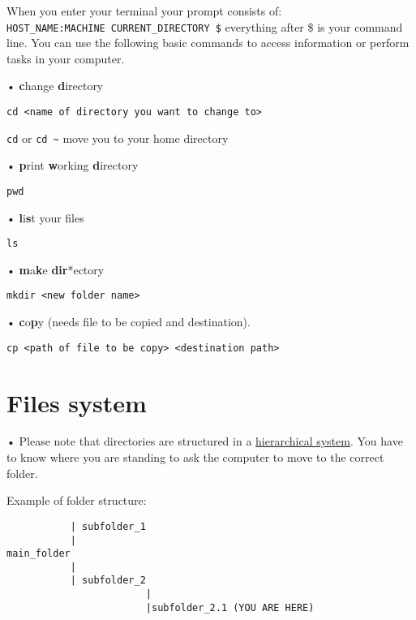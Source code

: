 \documentclass[
]{book}
\begin{document}
When you enter your terminal your prompt consists of: \texttt{HOST\_NAME:MACHINE\ CURRENT\_DIRECTORY\ \$} everything after \$ is your command line. You can use the following basic commands to access information or perform tasks in your computer.

• \textbf{c}hange \textbf{d}irectory

\begin{verbatim}
cd <name of directory you want to change to>
\end{verbatim}

\texttt{cd} or \texttt{cd\ \textasciitilde{}} move you to your home directory

• \textbf{p}rint \textbf{w}orking \textbf{d}irectory

\begin{verbatim}
pwd
\end{verbatim}

• \textbf{l}i\textbf{s}t your files

\begin{verbatim}
ls
\end{verbatim}

• \textbf{m}a\textbf{k}e \textbf{dir}*ectory

\begin{verbatim}
mkdir <new folder name>
\end{verbatim}

• \textbf{c}o\textbf{p}y (needs file to be copied and destination).

\begin{verbatim}
cp <path of file to be copy> <destination path>
\end{verbatim}

\hypertarget{files-system}{%
\section{Files system}\label{files-system}}

• Please note that directories are structured in a \href{https://www.geeksforgeeks.org/structures-of-directory-in-operating-system/}{hierarchical system}. You have to know where you are standing to ask the computer to move to the correct folder.

Example of folder structure:

\begin{verbatim}
           | subfolder_1 
           | 
main_folder
           |
           | subfolder_2
                        |
                        |subfolder_2.1 (YOU ARE HERE)
\end{verbatim}
\end{document}
